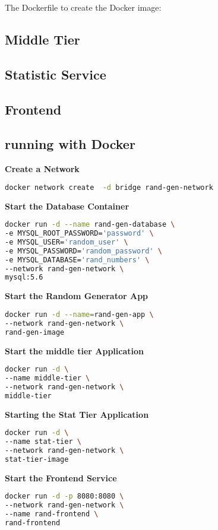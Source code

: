 The Dockerfile to create the Docker image:


\subsection{Middle Tier}




\subsection{Statistic Service}


\subsection{Frontend}


\subsection{running with Docker}

\textbf{Create a Network}
\begin{lstlisting}[language=Bash]
docker network create  -d bridge rand-gen-network
\end{lstlisting}

\textbf{Start the Database Container}

\begin{lstlisting}[language=Bash]
docker run -d --name rand-gen-database \
-e MYSQL_ROOT_PASSWORD='password' \
-e MYSQL_USER='random_user' \
-e MYSQL_PASSWORD='random_password' \
-e MYSQL_DATABASE='rand_numbers' \
--network rand-gen-network \
mysql:5.6
\end{lstlisting}

\textbf{Start the Random Generator App}
\begin{lstlisting}[language=Bash]
docker run -d --name=rand-gen-app \
--network rand-gen-network \
rand-gen-image
\end{lstlisting}

\textbf{Start the middle tier Application}
\begin{lstlisting}[language=Bash]
docker run -d \
--name middle-tier \
--network rand-gen-network \
middle-tier
\end{lstlisting}

\textbf{Starting the Stat Tier Application}
\begin{lstlisting}[language=Bash]
docker run -d \
--name stat-tier \
--network rand-gen-network \ 
stat-tier-image
\end{lstlisting}

\textbf{Start the Frontend Service}
\begin{lstlisting}[language=Bash]
docker run -d -p 8080:8080 \
--network rand-gen-network \
--name rand-frontend \
rand-frontend
\end{lstlisting}